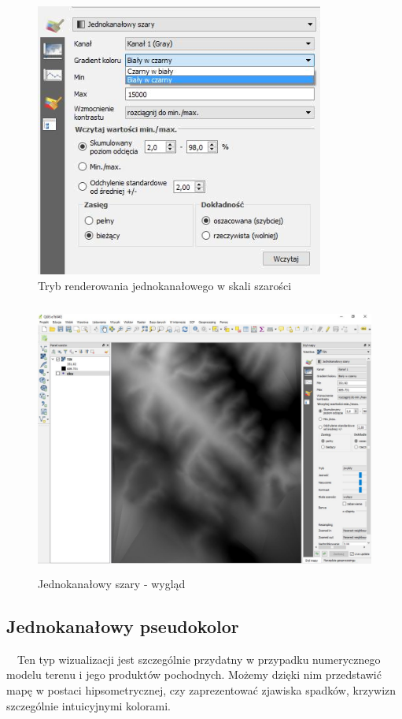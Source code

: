 \documentclass[12pt,a4paper]{book}
\begin{document}
\begin{figure}[ht]
	\centering
\includegraphics[height=9.0cm]{007-raster-jedno.png}
\caption{Tryb renderowania jednokanałowego w skali szarości}
\end{figure}
\begin{figure}[ht]
	\centering
\includegraphics[height=9.0cm]{007-raster-szary.jpg}
\caption{Jednokanałowy szary - wygląd}
\end{figure}
\subsection{Jednokanałowy pseudokolor}
\ \ Ten typ wizualizacji jest szczególnie przydatny w przypadku numerycznego modelu terenu i jego produktów pochodnych. Możemy dzięki nim przedstawić mapę w postaci hipsometrycznej, czy zaprezentować zjawiska spadków, krzywizn szczególnie intuicyjnymi kolorami.
\end{document}
